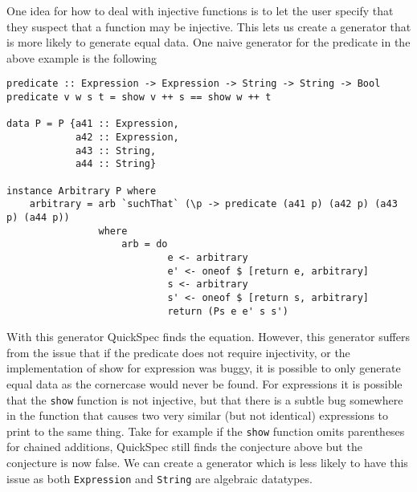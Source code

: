 One idea for how to deal with injective functions is to let the user specify that they suspect that 
a function may be injective. This lets us create a generator that is more likely to generate
equal data. One naive generator for the predicate in the above example is the following
\begin{verbatim}
predicate :: Expression -> Expression -> String -> String -> Bool
predicate v w s t = show v ++ s == show w ++ t

data P = P {a41 :: Expression,
            a42 :: Expression,
            a43 :: String,
            a44 :: String}

instance Arbitrary P where
    arbitrary = arb `suchThat` (\p -> predicate (a41 p) (a42 p) (a43 p) (a44 p))
                where
                    arb = do
                            e <- arbitrary
                            e' <- oneof $ [return e, arbitrary]
                            s <- arbitrary
                            s' <- oneof $ [return s, arbitrary]
                            return (Ps e e' s s')
\end{verbatim}
With this generator QuickSpec finds the equation.
However, this generator suffers from the issue that if the predicate does not require injectivity, or the implementation
of show for expression was buggy, it is possible to only generate equal data as the cornercase would never be found.
For expressions it is possible that the \texttt{show} function is not injective, but that there is a subtle bug
somewhere in the function that causes two very similar (but not identical) expressions to print to the same thing.
Take for example if the \texttt{show} function omits parentheses for chained additions, QuickSpec still finds
the conjecture above but the conjecture is now false.
We can create a generator which is less likely to have this issue as both \texttt{Expression}
and \texttt{String} are algebraic datatypes.
